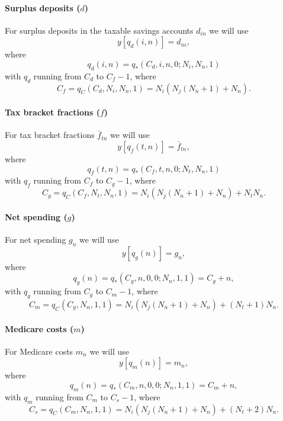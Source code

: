 \documentclass{report}[fleqn,11pt]
\begin{document}
\paragraph*{Surplus deposits (\boldmath$d$)}
For surplus deposits in the taxable savings accounts $d_{in}$ we will use
\begin{equation}
	y[q_d(i, n)] = d_{in},
\end{equation}
where
\begin{equation}
	q_d(i, n) = q_*(C_d, i, n, 0; N_i, N_n, 1)
\end{equation}
with $q_d$ running from $C_d$ to $C_f - 1$, where
\[
	C_f = q_C(C_d, N_i, N_n, 1) = N_i(N_j(N_n+1) + N_n).
\]

\paragraph*{Tax bracket fractions (\boldmath$f$)}
For tax bracket fractions $\bar{f}_{tn}$ we will use
\begin{equation}
	y[q_f(t, n)] = \bar{f}_{tn},
\end{equation}
where
\begin{equation}
	q_f(t, n) = q_*(C_f, t, n, 0; N_t, N_n, 1)
\end{equation}
with $q_f$ running from $C_f$ to $C_g - 1$, where
\[
	C_g = q_C(C_f, N_t, N_n, 1) = N_i(N_j(N_n+1) + N_n) + N_tN_n.
\]

\paragraph*{Net spending (\boldmath$g$)}
For net spending $g_{n}$ we will use
\begin{equation}
	y[q_g(n)] = g_{n},
\end{equation}
where
\begin{equation}
	q_g(n) = q_*(C_g, n, 0, 0; N_n, 1, 1) = C_g + n,
\end{equation}
with $q_g$ running from $C_g$ to $C_m - 1$, where
\[
	C_m = q_C(C_g, N_n, 1, 1) = N_i(N_j(N_n+1) + N_n) + (N_t + 1) N_n.
\]

\paragraph*{Medicare costs (\boldmath$m$)}
For Medicare costs $m_{n}$ we will use
\begin{equation}
	y[q_m(n)] = m_{n},
\end{equation}
where
\begin{equation}
	q_m(n) = q_*(C_m, n, 0, 0; N_n, 1, 1) = C_m + n,
\end{equation}
with $q_m$ running from $C_m$ to $C_s - 1$, where
\[
	C_s = q_C(C_m, N_n, 1, 1) = N_i(N_j(N_n+1) + N_n) + (N_t + 2) N_n.
\]
\end{document}
